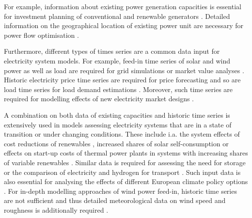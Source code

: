 For example, information about existing power generation capacities is essential for investment planning of conventional and renewable generators \cite{Kendziorski2017,Klein2017}. Detailed information on the geographical location of existing power unit are necessary for power flow optimisation \cite{Amme2018,Mueller2018,Mueller2017}.

Furthermore, different types of times series are a common data input for electricity system models. For example, feed-in time series of solar and wind power as well as load are required for grid simulations or market value analyses \cite{Fusco2017,Tafarte2017,ElAmary2018}. Historic electricity price time series are required for price forecasting \cite{Gonzales2018} and so are load time series for load demand estimations \cite{Yaslan2017}. Moreover, such time series are required for modelling effects of new electricity market designs \cite{Zaidi2018}. 

A combination on both data of existing capacities and historic time series is extensively used in models assessing electricity systems that are in a state of transition or under changing conditions. These include i.a. the system effects of cost reductions of renewables \cite{Gotzens2018}, increased shares of solar self-consumption \cite{Schill2017} or effects on start-up costs of thermal power plants in systems with increasing shares of variable renewables \cite{Schill2017b}. Similar data is required for assessing the need for storage \cite{Zerrahn2018} or the comparison of electricity and hydrogen for transport \cite{Robinius2018}.
Such input data is also essential for analysing the effects of different European climate policy options \cite{Nacken2017}.
For in-depth modelling approaches of wind power feed-in, historic time series are not sufficient and thus detailed meteorological data on wind speed and roughness is additionally required \cite{Olauson2018}.





